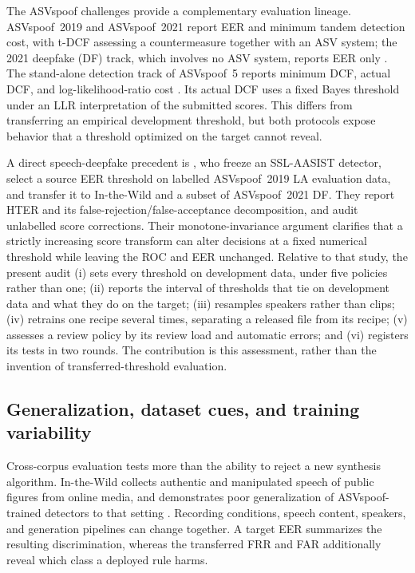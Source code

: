 The ASVspoof challenges provide a complementary evaluation lineage. ASVspoof~2019 and ASVspoof~2021 report EER and
minimum tandem detection cost, with t-DCF assessing a countermeasure together with an ASV system; the 2021 deepfake
(DF) track, which involves no ASV system, reports EER only \citep{kinnunen18_tdcf,kinnunen20_tdcf,wang20_asvspoof2019,liu23_asvspoof2021}. The stand-alone detection track of ASVspoof~5 reports
minimum DCF, actual DCF, and log-likelihood-ratio cost \citep{wang24_asvspoof5}. Its actual DCF uses a fixed Bayes
threshold under an LLR interpretation of the submitted scores. This differs from transferring an empirical
development threshold, but both protocols expose behavior that a threshold optimized on the target cannot reveal.

A direct speech-deepfake precedent is \citet{zhou26_eer_hides}, who freeze an SSL-AASIST detector, select a source
EER threshold on labelled ASVspoof~2019 LA evaluation data, and transfer it to In-the-Wild and a subset of
ASVspoof~2021 DF. They report HTER and its false-rejection/false-acceptance decomposition, and audit unlabelled
score corrections. Their monotone-invariance argument clarifies that a strictly increasing score transform can
alter decisions at a fixed numerical threshold while leaving the ROC and EER unchanged. Relative to that study, the
present audit (i) sets every threshold on development data, under five policies rather than one; (ii) reports the
interval of thresholds that tie on development data and what they do on the target; (iii) resamples speakers rather
than clips; (iv) retrains one recipe several times, separating a released file from its recipe; (v) assesses a review
policy by its review load and automatic errors; and (vi) registers its tests in two rounds. The contribution is this
assessment, rather than the invention of transferred-threshold evaluation.

\subsection{Generalization, dataset cues, and training variability}
Cross-corpus evaluation tests more than the ability to reject a new synthesis algorithm. In-the-Wild collects
authentic and manipulated speech of public figures from online media, and demonstrates poor generalization of
ASVspoof-trained detectors to that setting \citep{muller22_in_the_wild}. Recording conditions, speech content,
speakers, and generation pipelines can change together. A target EER summarizes the resulting discrimination,
whereas the transferred FRR and FAR additionally reveal which class a deployed rule harms.

